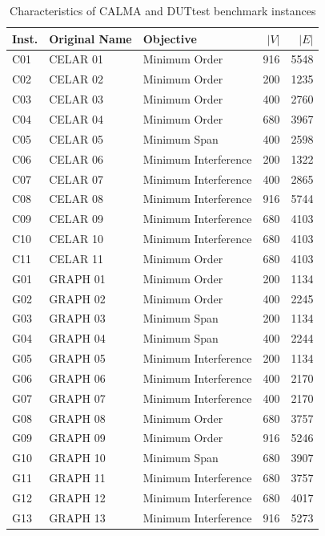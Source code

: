 \documentclass[letterpaper,journal]{IEEEtran}
\begin{document}
\begin{table}[htbp]
\centering
\caption{Characteristics of CALMA and DUTtest benchmark instances}
\label{tab:calma}
\begin{tabular}{l l l r r}
\toprule
\textbf{Inst.} & \textbf{Original Name} & \textbf{Objective} & $|V|$ & $|E|$ \\
\midrule
C01 & CELAR 01 & Minimum Order        & 916 & 5548 \\
C02 & CELAR 02 & Minimum Order        & 200 & 1235 \\
C03 & CELAR 03 & Minimum Order        & 400 & 2760 \\
C04 & CELAR 04 & Minimum Order        & 680 & 3967 \\
C05 & CELAR 05 & Minimum Span         & 400 & 2598 \\
C06 & CELAR 06 & Minimum Interference & 200 & 1322 \\
C07 & CELAR 07 & Minimum Interference & 400 & 2865 \\
C08 & CELAR 08 & Minimum Interference & 916 & 5744 \\
C09 & CELAR 09 & Minimum Interference & 680 & 4103 \\
C10 & CELAR 10 & Minimum Interference & 680 & 4103 \\
C11 & CELAR 11 & Minimum Order        & 680 & 4103 \\
G01 & GRAPH 01 & Minimum Order        & 200 & 1134 \\
G02 & GRAPH 02 & Minimum Order        & 400 & 2245 \\
G03 & GRAPH 03 & Minimum Span         & 200 & 1134 \\
G04 & GRAPH 04 & Minimum Span         & 400 & 2244 \\
G05 & GRAPH 05 & Minimum Interference & 200 & 1134 \\
G06 & GRAPH 06 & Minimum Interference & 400 & 2170 \\
G07 & GRAPH 07 & Minimum Interference & 400 & 2170 \\
G08 & GRAPH 08 & Minimum Order        & 680 & 3757 \\
G09 & GRAPH 09 & Minimum Order        & 916 & 5246 \\
G10 & GRAPH 10 & Minimum Span         & 680 & 3907 \\
G11 & GRAPH 11 & Minimum Interference & 680 & 3757 \\
G12 & GRAPH 12 & Minimum Interference & 680 & 4017 \\
G13 & GRAPH 13 & Minimum Interference & 916 & 5273 \\

\end{tabular}
\end{table}
\end{document}
